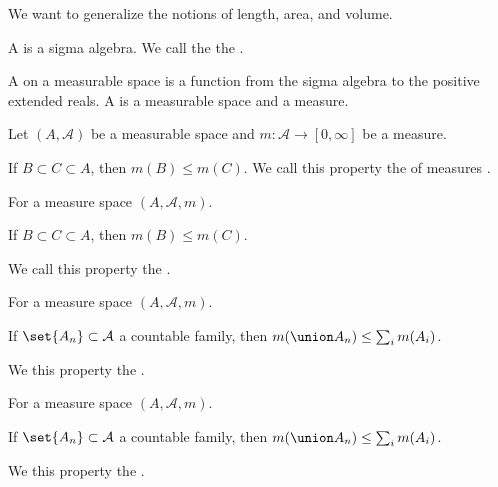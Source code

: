 
\sbasic



\sstart



We want to generalize the notions
of length, area, and volume.


A
is a sigma algebra.
We call the
the .

A
on a measurable space
is a function from the sigma algebra
to the positive extended reals.
A
is a measurable space and a measure.



\begin{prop}
  Let $(A, \mathcal{A})$ be a measurable space and
  $m: \mathcal{A} \to [0, \infty]$ be a measure.

  If $B \subset C \subset A$, then $m(B) \leq m(C)$.
  We call this property the of measures
  .
\end{prop}

\begin{prop}
  For a measure space $(A, \mathcal{A}, m)$.

  If $B \subset C \subset A$, then $m(B) \leq m(C)$.

  We call this property the
  .
\end{prop}

\begin{prop}
  For a measure space $(A, \mathcal{A}, m)$.

  If $\set{A_n} \subset \mathcal{A}$ a countable family,
  then $m(\union A_n) \leq \sum_{i} m(A_i)$.

  We this property the
  .
\end{prop}

\begin{prop}
  For a measure space $(A, \mathcal{A}, m)$.

  If $\set{A_n} \subset \mathcal{A}$ a countable family,
  then $m(\union A_n) \leq \sum_{i} m(A_i)$.

  We this property the
  .
\end{prop}

